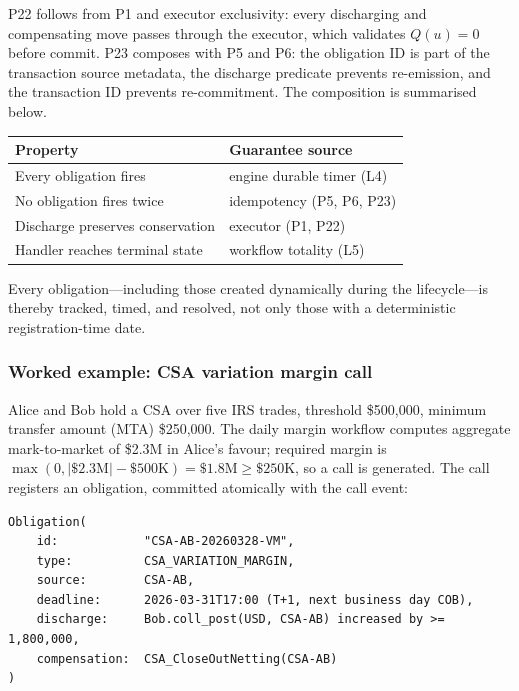 \noindent P22 follows from P1 and executor exclusivity: every discharging and compensating move passes through the executor, which validates $Q(u)=0$ before commit. P23 composes with P5 and P6: the obligation ID is part of the transaction source metadata, the discharge predicate prevents re-emission, and the transaction ID prevents re-commitment. The composition is summarised below.

\begin{center}
\small
\begin{tabular}{l l}
\toprule
\textbf{Property} & \textbf{Guarantee source} \\
\midrule
Every obligation fires & engine durable timer (L4) \\
No obligation fires twice & idempotency (P5, P6, P23) \\
Discharge preserves conservation & executor (P1, P22) \\
Handler reaches terminal state & workflow totality (L5) \\
\bottomrule
\end{tabular}
\end{center}

\noindent Every obligation---including those created dynamically during the lifecycle---is thereby tracked, timed, and resolved, not only those with a deterministic registration-time date.

\subsubsection{Worked example: CSA variation margin call}
\label{sec:obligation-example-csa}

Alice and Bob hold a CSA over five IRS trades, threshold \$500{,}000, minimum transfer amount (MTA) \$250{,}000. The daily margin workflow computes aggregate mark-to-market of \$2.3M in Alice's favour; required margin is $\max(0, |\$2.3\text{M}| - \$500\text{K}) = \$1.8\text{M} \geq \$250\text{K}$, so a call is generated. The call registers an obligation, committed atomically with the call event:

\begin{lstlisting}
Obligation(
    id:            "CSA-AB-20260328-VM",
    type:          CSA_VARIATION_MARGIN,
    source:        CSA-AB,
    deadline:      2026-03-31T17:00 (T+1, next business day COB),
    discharge:     Bob.coll_post(USD, CSA-AB) increased by >= 1,800,000,
    compensation:  CSA_CloseOutNetting(CSA-AB)
)
\end{lstlisting}

